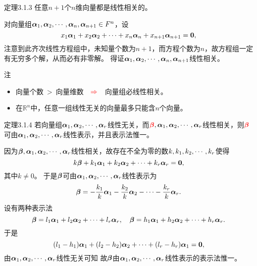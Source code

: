 \begin{frame}
  \begin{footnotesize}
    \begin{block}{定理3.1.3}      
      任意$n+1$个$n$维向量都是线性相关的。
    \end{block}
    \pause 
    \proofname
    对向量组$\boldsymbol{\alpha}_1,\boldsymbol{\alpha}_2,\cdots,\boldsymbol{\alpha}_n,\boldsymbol{\alpha}_{n+1}\in F^n$，设
    $$
    x_1 \boldsymbol{\alpha}_1 + x_2 \boldsymbol{\alpha}_2 + \cdots + x_n \boldsymbol{\alpha}_n + x_{n+1} \boldsymbol{\alpha}_{n+1} = \mathbf{0},  
    $$
    注意到此齐次线性方程组中，未知量个数为$n+1$，而方程个数为$n$，故方程组一定有无穷多个解，从而必有非零解。
    得证$\boldsymbol{\alpha}_1,\boldsymbol{\alpha}_2,\cdots,\boldsymbol{\alpha}_n,\boldsymbol{\alpha}_{n+1}$线性相关。
    
    \pause 
    \begin{block}{注}
      \begin{itemize}
      \item    向量个数$~>~$向量维数 $~~\textcolor{red}{\Rightarrow}~~$ 向量组必线性相关。\pause 
      \item     在$\mathbb R^n$中，任意一组线性无关的向量最多只能含$n$个向量。
      \end{itemize}
    \end{block}
      
    
  \end{footnotesize}
\end{frame}


\begin{frame}
  \begin{footnotesize}
    \begin{block}{定理3.1.4}
      若向量组$\boldsymbol{\alpha}_1,\boldsymbol{\alpha}_2,\cdots,\boldsymbol{\alpha}_r$线性无关，而$\textcolor{red}{\boldsymbol{\beta}},\boldsymbol{\alpha}_1,\boldsymbol{\alpha}_2,\cdots,\boldsymbol{\alpha}_r$线性相关，则$\textcolor{red}{\boldsymbol{\beta}}$可由$\boldsymbol{\alpha}_1,\boldsymbol{\alpha}_2,\cdots,\boldsymbol{\alpha}_r$线性表示，并且表示法惟一。
    \end{block}
    \pause
    \proofname 
    因为$\boldsymbol{\beta},\boldsymbol{\alpha}_1,\boldsymbol{\alpha}_2,\cdots,\boldsymbol{\alpha}_r$线性相关，故存在不全为零的数$k,k_1,k_2,\cdots,k_r$使得
    $$
    k\boldsymbol{\beta} + k_1\boldsymbol{\alpha}_1+k_2\boldsymbol{\alpha}_2+\cdots+k_r\boldsymbol{\alpha}_r=\mathbf{0},
    $$
    其中$k\ne 0 $\pause {}。 \pause 
    于是$\boldsymbol{\beta}$可由$\boldsymbol{\alpha}_1,\boldsymbol{\alpha}_2,\cdots,\boldsymbol{\alpha}_r$线性表示为
    $$
    \boldsymbol{\beta}=-\frac{k_1}k\boldsymbol{\alpha}_1-\frac{k_2}k\boldsymbol{\alpha}_2-\cdots-\frac{k_r}k\boldsymbol{\alpha}_r.
    $$
    \pause 
     \quad 设有两种表示法
    $$
    \boldsymbol{\beta}=l_1\boldsymbol{\alpha}_1+l_2\boldsymbol{\alpha}_2+\cdots+l_r\boldsymbol{\alpha}_r,\quad
    \boldsymbol{\beta}=h_1\boldsymbol{\alpha}_1+h_2\boldsymbol{\alpha}_2+\cdots+h_r\boldsymbol{\alpha}_r.
    $$ \pause
    于是
    $$
    (l_1-h_1)\boldsymbol{\alpha}_1+(l_2-h_2)\boldsymbol{\alpha}_2+\cdots+(l_r-h_r)\boldsymbol{\alpha}_1=\mathbf{0},
    $$ \pause
    由$\boldsymbol{\alpha}_1,\boldsymbol{\alpha}_2,\cdots,\boldsymbol{\alpha}_r$线性无关可知
    故$\boldsymbol{\beta}$由$\boldsymbol{\alpha}_1,\boldsymbol{\alpha}_2,\cdots,\boldsymbol{\alpha}_r$线性表示的表示法惟一。
  \end{footnotesize}
\end{frame}



